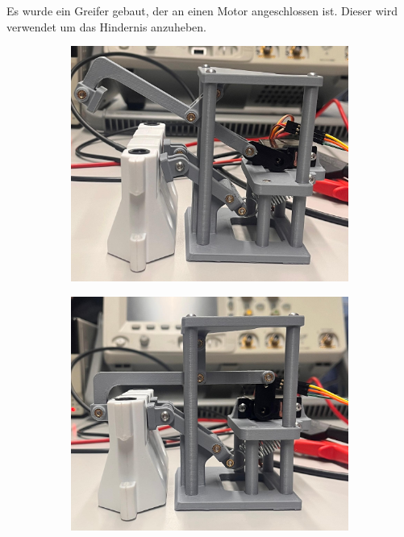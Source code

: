 Es wurde ein Greifer gebaut, der an einen Motor angeschlossen ist. Dieser wird verwendet um das Hindernis anzuheben.

\begin{figure}[H]
\begin{subfigure}{0.33\textwidth}
\includegraphics[width=0.95\linewidth]{assets/greifer-prototyp/Bild_Greifer_2_offen.jpeg} 
\end{subfigure}
\begin{subfigure}{0.328\textwidth}
\includegraphics[width=0.95\linewidth]{assets/greifer-prototyp/Bild_Greifer_2_klemmen.jpeg} 
\end{subfigure}

\end{figure}
